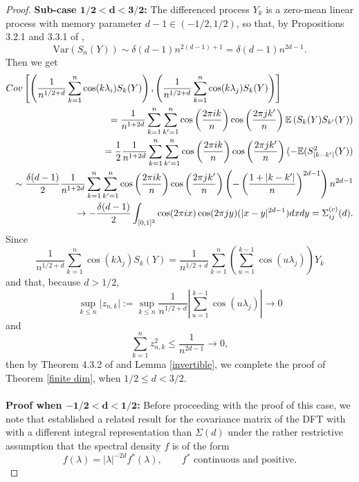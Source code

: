\documentclass[10pt,a4paper]{amsart}
\numberwithin{equation}{section}
\begin{document}
\begin{proof}
{\bf Sub-case $\mathbf{1/2<d<3/2}$:}  The differenced process $Y_k$ is a zero-mean linear process with memory parameter $d-1\in(-1/2,1/2)$, so that, by Propositions  3.2.1 and 3.3.1 of \cite{MR2977317},
\begin{equation}\label{giraitis stationary}
\textrm{Var}(S_n(Y))\sim\delta(d-1)n^{2(d-1)+1}=\delta(d-1) n^{2d-1}.
\end{equation}
Then we get
\begin{eqnarray}\label{cumsum}\lefteqn{
    \textrm{Cov}\left[\left(\frac{1} {n^{1/2+d}}\sum_{k=1}^n\cos(k\lambda_{i})S_k(Y)\right),\left(\frac{1}{n^{1/2+d}}\sum_{k=1}^n\cos(k\lambda_{j})S_k(Y)\right)\right]}\nonumber\\
    &&=\frac{1}{n^{1+2d}}\sum_{k=1}^n\sum_{k'=1}^n\cos\left(\frac{2\pi ik}{n}\right)\cos\left(\frac{2\pi jk'}{n}\right)\mathbb{E}\left(S_k(Y)S_{k'}(Y)\right)\nonumber\\ 
    &&=\frac{1}{2}\frac{1}{n^{1+2d}}\sum_{k=1}^n\sum_{k'=1}^n\cos\left(\frac{2\pi ik}{n}\right)\cos\left(\frac{2\pi jk'}{n}\right)(-\mathbb{E}(S^2_{\vert k-k'\vert}(Y))\nonumber\\
    &&\sim\frac{\delta(d-1)}{2}\frac{1}{n^{1+2d}}\sum_{k=1}^n\sum_{k'=1}^n\cos\left(\frac{2\pi ik}{n}\right)\cos\left(\frac{2\pi jk'}{n}\right)\left(-\left(\frac{1+\vert k-k'\vert}{n}\right)^{2d-1}\right)n^{2d-1}\nonumber\\
&&\to-\frac{\delta(d-1)}{2}\int_{[0,1]^2}\cos(2\pi ix)\cos(2\pi jy)(\vert x- y\vert^{2d-1})dxdy=\Sigma_{ij}^{(c)}(d).
\end{eqnarray}
Since 
$$
\frac{1} {n^{1/2+d}}\sum_{k=1}^n\cos(k\lambda_{j})S_k(Y)=\frac{1} {n^{1/2+d}}\sum_{k=1}^n\left(\sum_{u=1}^{k-1}\cos(u\lambda_{j})\right)Y_k
$$
and that, because $d>1/2$,
$$
\underset{k\le n}{\sup}\vert z_{n,k}\vert:=\underset{k\le n}{\sup}\frac{1} {n^{1/2+d}}\left\vert\sum_{u=1}^{k-1}\cos(u\lambda_{j})\right\vert\to0
$$
and
$$
\sum_{k=1}^nz_{n,k}^2\le\frac{1}{n^{2d-1}}\to0,
$$
then by Theorem 4.3.2 of \cite{MR2977317} and Lemma \ref{invertible},  we complete the proof of   Theorem  \ref{finite dim}, when  $1/2\le d<3/2$.\\\\
{\bf Proof when $\mathbf{-1/2<d<1/2}$:} 
Before proceeding with the proof of this case, we note that \cite{MR1243575} established a related result for the covariance matrix of the DFT with with a different integral representation than  $\Sigma(d)$ under the rather restrictive assumption that the spectral density $f$ is of the form
\[
f(\lambda)=|\lambda|^{-2d}f^*(\lambda), \qquad f^* \text{ continuous and positive}.
\]
\end{proof}
\end{document}
